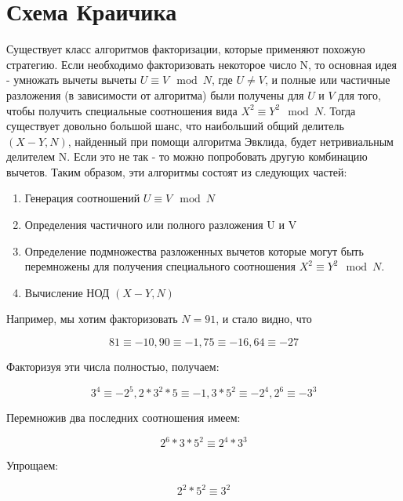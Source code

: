 \documentclass[a4paper,12pt]{report}
\begin{document}
\section{Схема Краичика}

Существует класс алгоритмов факторизации, которые применяют похожую стратегию. Если необходимо факторизовать некоторое число N, то основная идея - умножать вычеты вычеты $U \equiv V \mod{N}$, где $ U \neq V$, и полные или частичные разложения (в зависимости от алгоритма) были получены для $U$ и $V$ для того, чтобы получить специальные соотношения вида $X^2 \equiv Y^2 \mod N$. Тогда существует довольно большой шанс, что наибольший общий делитель $(X - Y, N)$, найденный при помощи алгоритма Эвклида, будет нетривиальным делителем N. Если это не так - то можно попробовать другую комбинацию вычетов. Таким образом, эти алгоритмы состоят из следующих частей:

\begin{enumerate}
	\item Генерация соотношений $U \equiv V \mod N$ \label{itemone}
	\item Определения частичного или полного разложения U и V \label{itemtwo}
	\item Определение подмножества разложенных вычетов которые могут быть перемножены для получения специального соотношения $X^2 \equiv Y^2 \mod N$. \label{itemthree}
	\item Вычисление НОД $(X - Y, N)$ \label{itemfour}
\end{enumerate}



Например, мы хотим факторизовать $N = 91$, и стало видно, что 

\begin{equation*}
81 \equiv -10, 90 \equiv -1, 75 \equiv -16, 64 \equiv -27
\end{equation*}

Факторизуя эти числа полностью, получаем:

\begin{equation*}
3^4 \equiv {-2}^5, 2*3^2*5 \equiv -1, 3*5^2 \equiv {-2}^4, 2^6 \equiv {-3}^3
\end{equation*}


Перемножив два последних соотношения имеем:

\begin{equation*}
2^6*3*5^2 \equiv 2^4*3^3
\end{equation*}

Упрощаем:

\begin{equation*}
2^2*5^2 \equiv 3^2
\end{equation*}
\end{document}
